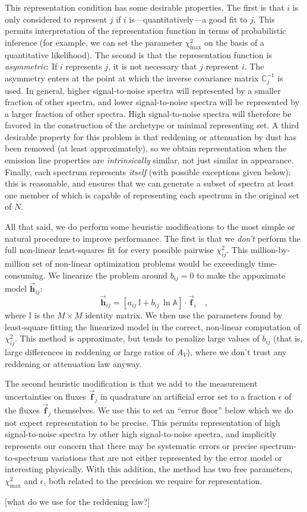 \documentclass[12pt,letterpaper]{article}
\newcommand{\aij}{a_{ij}}
\newcommand{\bij}{b_{ij}}
\newcommand{\chisqij}{\chi^2_{ij}}
\newcommand{\chisqmax}{\chi^2_{\mathrm{max}}}
\newcommand{\datavec}[1]{\vec{\boldsymbol{#1}}}
\newcommand{\vfi}{\datavec{f}_{\!i}}
\newcommand{\vfj}{\datavec{f}_{\!j}}
\newcommand{\vfapproxij}{\datavec{h}_{ij}}
\newcommand{\datamatrix}[1]{\mathbb{#1}}
\newcommand{\identity}{\datamatrix{I}}
\newcommand{\reddening}{\datamatrix{A}}
\newcommand{\invcovarj}{\datamatrix{C}^{-1}_{j}}
\begin{document}
This representation condition has some desirable properties.  The
first is that $i$ is only considered to represent $j$ if $i$
is---quantitatively---a good fit to $j$.  This permits interpretation
of the representation function in terms of probabilistic inference
(for example, we can set the parameter $\chisqmax$ on the basis of a
quantitative likelihood).  The second is that the representation
function is \emph{asymmetric}: If $i$ represents $j$, it is not
necessary that $j$ represent $i$.  The asymmetry enters at the point
at which the inverse covariance matrix $\invcovarj$ is used.  In
general, higher signal-to-noise spectra will represented by a smaller
fraction of other spectra, and lower signal-to-noise spectra will be
represented by a larger fraction of other spectra.  High
signal-to-noise spectra will therefore be favored in the construction
of the archetype or minimal representing set.  A third desirable
property for this problem is that reddening or attenuation by dust has
been removed (at least approximately), so we obtain representation
when the emission line properties are \emph{intrinsically} similar,
not just similar in appearance.  Finally, each spectrum represents
\emph{itself} (with possible exceptions given below); this is
reasonable, and ensures that we can generate a subset of spectra at
least one member of which is capable of representing each spectrum in
the original set of $N$.

All that said, we do perform some heuristic modifications to the most
simple or natural procedure to improve performance.  The first is that
we \emph{don't} perform the full non-linear least-squares fit for
every possible pairwise $\chisqij$.  This million-by-million set of
non-linear optimization problems would be exceedingly time-consuming.
We linearize the problem around $\bij=0$ to make the appoximate model
$\vfapproxij$:
\begin{equation}
\vfapproxij= \left[\aij\,\identity + \bij\,\ln\reddening\right]\cdot\vfi
\quad,
\end{equation}
where $\identity$ is the $M\times M$ identity matrix.  We then use the
parameters found by least-square fitting the linearized model in the
correct, non-linear computation of $\chisqij$.  This method is
approximate, but tends to penalize large values of $\bij$ (that is,
large differences in reddening or large ratios of $A_V$), where we don't
trust any reddening or attenuation law anyway.

The second heuristic modification is that we add to the measurement
uncertainties on fluxes $\vfj$ in quadrature an artificial error set
to a fraction $\epsilon$ of the fluxes $\vfj$ themselves.  We use this
to set an ``error floor'' below which we do not expect representation
to be precise.  This permits representation of high signal-to-noise
spectra by other high signal-to-noise spectra, and implicitly
represents our concern that there may be systematic errors or precise
spectrum-to-spectrum variations that are not either represented by the
error model or interesting physically.  With this addition, the method
has two free parameters, $\chisqmax$ and $\epsilon$, both related to
the precision we require for representation.

[what do we use for the reddening law?]
\end{document}
